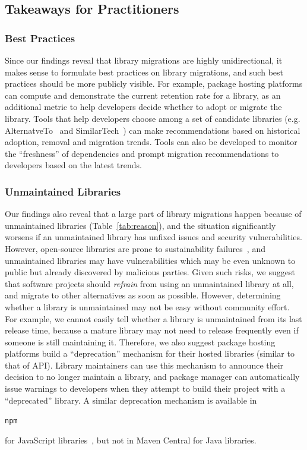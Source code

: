 \documentclass[sigconf, screen]{acmart}
\newcommand{\Code}[1]{\begin{small}\texttt{#1}\end{small}}
\begin{document}
\subsection{Takeaways for Practitioners}

\subsubsection{Best Practices}

Since our findings reveal that library migrations are highly unidirectional, it makes sense to formulate best practices on library migrations, and such best practices should be more publicly visible.
For example, package hosting platforms can compute and demonstrate the current retention rate for a library, as an additional metric to help developers decide whether to adopt or migrate the library.
Tools that help developers choose among a set of candidate libraries (e.g. AlternatveTo~\cite{AlternativeTo} and SimilarTech~\cite{chen2016similartech}) can make recommendations based on historical adoption, removal and migration trends.
Tools can also be developed to monitor the ``freshness'' of dependencies and prompt migration recommendations to developers based on the latest trends.

\subsubsection{Unmaintained Libraries}

Our findings also reveal that a large part of library migrations happen because of unmaintained libraries (Table~\ref{tab:reason}), and the situation significantly worsens if an unmaintained library has unfixed issues and security vulnerabilities.
However, open-source libraries are prone to sustainability failures~\cite{coelho2017modern, valiev2018ecosystem}, 
and unmaintained libraries may have vulnerabilities which may be even unknown to public but already discovered by malicious parties.
Given such risks, we suggest that software projects should \textit{refrain} from using an unmaintained library at all, and migrate to other alternatives as soon as possible.
However, determining whether a library is unmaintained may not be easy without community effort.
For example, we cannot easily tell whether a library is unmaintained from its last release time, because a mature library may not need to release frequently even if someone is still maintaining it.
Therefore, we also suggest package hosting platforms build a ``deprecation'' mechanism for their hosted libraries (similar to that of API).
Library maintainers can use this mechanism to announce their decision to no longer maintain a library, and package manager can automatically issue warnings to developers when they attempt to build their project with a ``deprecated'' library.
A similar deprecation mechanism is available in \Code{npm} for JavaScript libraries~\cite{cogo2021deprecation}, but not in Maven Central for Java libraries.
\end{document}

